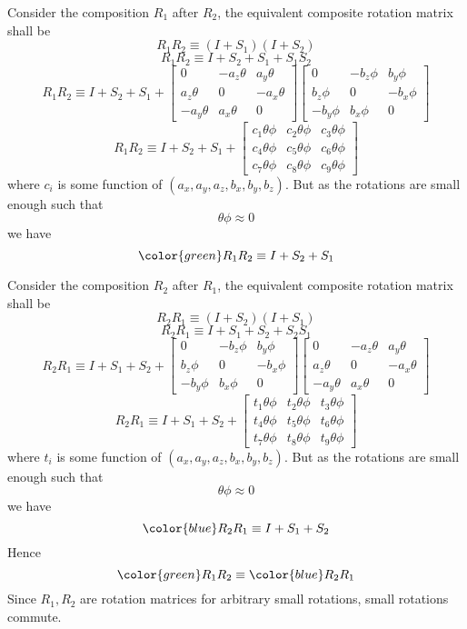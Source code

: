 \documentclass[12pt]{article}
\begin{document}
Consider the composition $R_1$ after $R_2$, the equivalent composite rotation matrix shall be
\[
  R_1 R_2 \equiv (I + S_1) (I + S_2)
\]
\[
  R_1 R_2 \equiv I + S_2 + S_1 + S_1S_2
\]
\[
  R_1 R_2 \equiv I + S_2 + S_1 +
  \begin{bmatrix}
    0 & -a_z\theta & a_y\theta\\
     a_z\theta & 0 & -a_x\theta \\
     -a_y\theta & a_x\theta & 0
  \end{bmatrix}
  \begin{bmatrix}
    0 & -b_z\phi & b_y\phi\\
     b_z\phi & 0 & -b_x\phi \\
     -b_y\phi & b_x\phi & 0
  \end{bmatrix}
\]
\[
  R_1 R_2 \equiv I + S_2 + S_1 +
  \begin{bmatrix}
    c_1\theta\phi & c_2\theta\phi & c_3\theta\phi \\
    c_4\theta\phi & c_5\theta\phi & c_6\theta\phi \\
    c_7\theta\phi & c_8\theta\phi & c_9\theta\phi
  \end{bmatrix}
\]
where $c_i$ is some function of $(a_x, a_y, a_z, b_x, b_y, b_z)$. But as the rotations are small enough such that
\[
  \theta\phi \approx 0
\]
we have
\[
  {\color{green} R_1 R_2 \equiv I + S_2 + S_1}
\]

Consider the composition $R_2$ after $R_1$, the equivalent composite rotation matrix shall be
\[
  R_2 R_1 \equiv (I + S_2) (I + S_1)
\]
\[
  R_2 R_1 \equiv I + S_1 + S_2 + S_2S_1
\]
\[
  R_2 R_1 \equiv I + S_1 + S_2 +
  \begin{bmatrix}
    0 & -b_z\phi & b_y\phi\\
     b_z\phi & 0 & -b_x\phi \\
     -b_y\phi & b_x\phi & 0
  \end{bmatrix}
  \begin{bmatrix}
    0 & -a_z\theta & a_y\theta\\
     a_z\theta & 0 & -a_x\theta \\
     -a_y\theta & a_x\theta & 0
  \end{bmatrix}
\]
\[
  R_2 R_1 \equiv I + S_1 + S_2 +
  \begin{bmatrix}
    t_1\theta\phi & t_2\theta\phi & t_3\theta\phi \\
    t_4\theta\phi & t_5\theta\phi & t_6\theta\phi \\
    t_7\theta\phi & t_8\theta\phi & t_9\theta\phi
  \end{bmatrix}
\]
where $t_i$ is some function of $(a_x, a_y, a_z, b_x, b_y, b_z)$. But as the rotations are small enough such that
\[
  \theta\phi \approx 0
\]
we have
\[
  {\color{blue} R_2 R_1 \equiv I + S_1 + S_2}
\]
Hence
\[
  {\color{green} R_1R_2} \equiv {\color{blue} R_2R_1}
\]
Since $R_1, R_2$ are rotation matrices for arbitrary small rotations, small rotations commute.
\pagebreak
\end{document}
